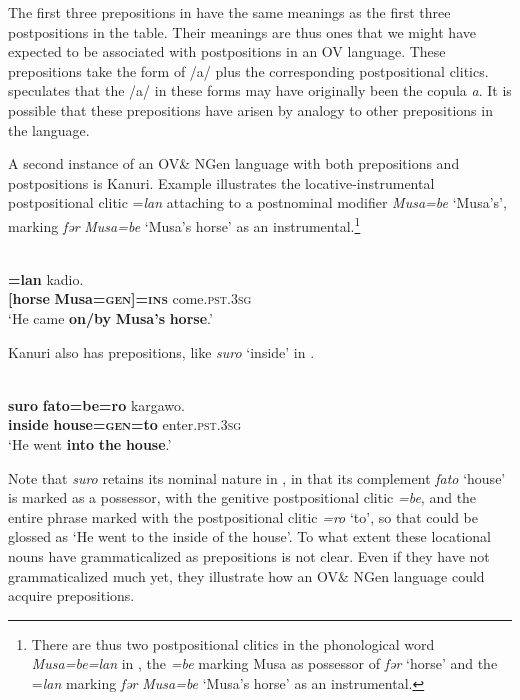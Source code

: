 \documentclass[output=paper]{langsci/langscibook}
\begin{document}
The first three prepositions in  have the same meanings as the first three postpositions in the table. Their meanings are thus ones that we might have expected to be associated with postpositions in an OV language. These prepositions take the form of /a/ plus the corresponding postpositional clitics. \citet[102]{Mous1993} speculates that the /a/ in these forms may have originally been the copula \textit{a}. It is possible that these prepositions have arisen by analogy to other prepositions in the language.

A second instance of an OV\& NGen language with both prepositions and postpositions is Kanuri. Example  illustrates the locative-instrumental postpositional clitic =\textit{lan} attaching to a postnominal modifier \textit{Musa=be} ‘Musa’s’, marking \textit{fər} \textit{Musa=be} ‘Musa’s horse’ as an instrumental.\footnote{There are thus two postpositional clitics in the phonological word \textit{Musa=be=lan} in , the \textit{=be} marking Musa as possessor of \textit{fər} ‘horse’ and the =\textit{lan} marking  \textit{fər} \textit{Musa=be} ‘Musa’s horse’ as an instrumental.}

\ea\label{ex:dryer:}
\\
\gll [\textbf{fər}  \textbf{Musa=be}]\textbf{=lan}  kadio.\\
       \textbf{[horse}  \textbf{Musa=\textsc{gen]=ins}}  come.\textsc{pst.3sg}  \\
\glt ‘He came \textbf{on/by} \textbf{Musa’s} \textbf{horse}.’
\z

Kanuri also has prepositions, like \textit{suro} ‘inside’ in .

\ea\label{ex:dryer:}
\\
\gll   \textbf{suro}  \textbf{fato=be=ro}  kargawo.\\
       \textbf{inside}  \textbf{house=\textsc{gen}}\textbf{=to}  enter.\textsc{pst.3sg}\\
\glt   ‘He went \textbf{into} \textbf{the} \textbf{house}.’
\z

Note that \textit{suro} retains its nominal nature in , in that its complement \textit{fato} ‘house’ is marked as a possessor, with the genitive postpositional clitic \textit{=be}, and the entire phrase marked with the postpositional clitic \textit{=ro} ‘to’, so that  could be glossed as ‘He went to the inside of the house’. To what extent these locational nouns have grammaticalized as prepositions is not clear. Even if they have not grammaticalized much yet, they illustrate how an OV\& NGen language could acquire prepositions.
\end{document}
